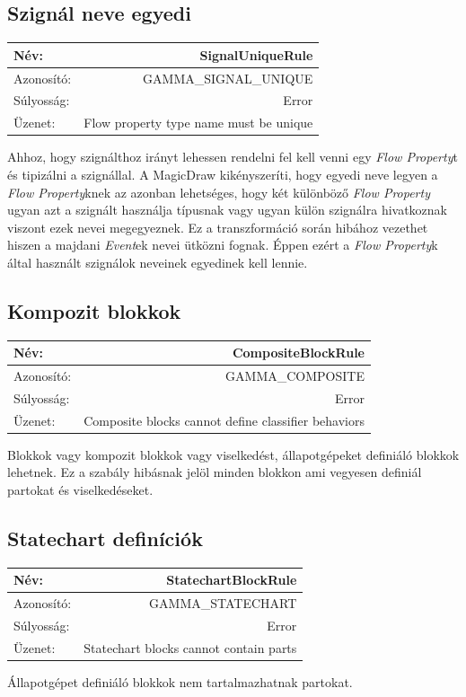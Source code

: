 \subsection{Szignál neve egyedi}
\begin{tabular}{ | l | r | }
	\hline
	Név: & SignalUniqueRule  \\ 
	\hline
	Azonosító: & GAMMA\_SIGNAL\_UNIQUE \\
	\hline
	Súlyosság: & Error \\  
	\hline
	Üzenet: & Flow property type name must be unique \\
	\hline
\end{tabular}\newline
\newline
Ahhoz, hogy szignálthoz irányt lehessen rendelni fel kell venni egy \emph{Flow Property}t és tipizálni a szignállal. A MagicDraw kikényszeríti, hogy egyedi neve legyen a \emph{Flow Property}knek az azonban lehetséges, hogy két különböző \emph{Flow Property} ugyan azt a szignált használja típusnak vagy ugyan külön szignálra hivatkoznak viszont ezek nevei megegyeznek. Ez a transzformáció során hibához vezethet hiszen a majdani \emph{Event}ek nevei ütközni fognak. Éppen ezért a \emph{Flow Property}k által használt szignálok neveinek egyedinek kell lennie.

\subsection{Kompozit blokkok}
\begin{tabular}{ | l | r | }
	\hline
	Név: & CompositeBlockRule  \\ 
	\hline
	Azonosító: & GAMMA\_COMPOSITE \\
	\hline
	Súlyosság: & Error \\  
	\hline
	Üzenet: & Composite blocks cannot define classifier behaviors \\
	\hline
\end{tabular}\newline
\newline
Blokkok vagy kompozit blokkok vagy viselkedést, állapotgépeket definiáló blokkok lehetnek. Ez a szabály hibásnak jelöl minden blokkon ami vegyesen definiál partokat és viselkedéseket.

\subsection{Statechart definíciók}
\begin{tabular}{ | l | r | }
	\hline
	Név: & StatechartBlockRule  \\ 
	\hline
	Azonosító: & GAMMA\_STATECHART \\
	\hline
	Súlyosság: & Error \\  
	\hline
	Üzenet: & Statechart blocks cannot contain parts \\
	\hline
\end{tabular}\newline
\newline
Állapotgépet definiáló blokkok nem tartalmazhatnak partokat.


